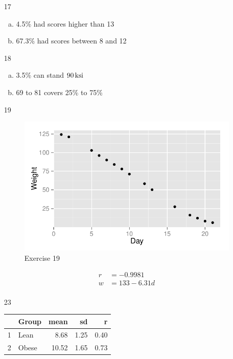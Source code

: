 \documentclass[letterpaper, landscape]{exam}
\begin{document}
\begin{enumerate}
    \item[17]
      \begin{enumerate}[(a)]
        \item 4.5\% had scores higher than 13
        \item 67.3\% had scores between 8 and 12
      \end{enumerate}

    \item[18]
      \begin{enumerate}[(a)]
        \item 3.5\% can stand $\unit[90]{ksi}$
        \item 69 to 81 covers 25\% to 75\%
      \end{enumerate}

    \item[19]
      \begin{figure}[H]
        \centering
        \includegraphics[scale = 0.8]{figures/ex19.pdf}
        \caption{Exercise 19}
      \end{figure}

      \begin{align*}
        r & = -0.9981 \\
        w & = 133 - 6.31 d \\
      \end{align*}

    \item[23]
      \begin{table}[H]
        \centering
        \begin{tabular}{rlrrr}
          \toprule
                   & Group & mean  & sd   & r \\
          \midrule
          1        & Lean  & 8.68  & 1.25 & 0.40 \\
          2        & Obese & 10.52 & 1.65 & 0.73 \\
          \bottomrule
        \end{tabular}
      \end{table}


\end{enumerate}
\end{document}
